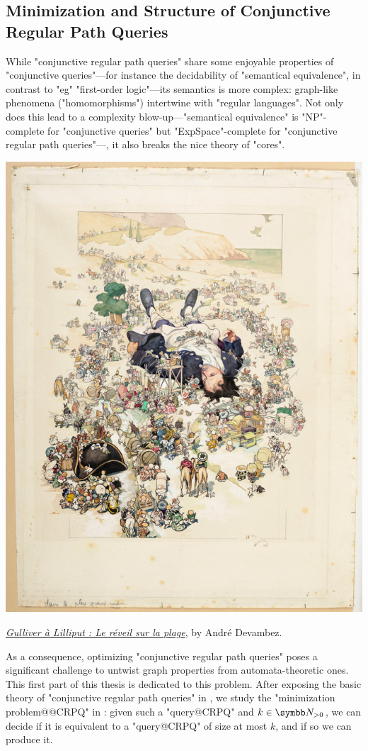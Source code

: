 \subsection[Minimization and Structure of CRPQs]{Minimization and Structure of Conjunctive Regular Path Queries}

While "conjunctive regular path queries" share some enjoyable properties
of "conjunctive queries"---for instance the decidability of "semantical equivalence",
in contrast to "eg" "first-order logic"---its semantics is more complex:
graph-like phenomena ("homomorphisms") intertwine with "regular languages".
Not only does this lead to a complexity blow-up---"semantical equivalence" is "NP"-complete
for "conjunctive queries" but "ExpSpace"-complete for "conjunctive regular path queries"---,
it also breaks the nice theory of "cores".

\begin{marginfigure}[5em]
	\centering
	\includegraphics[width=\linewidth]{fig/intro/Gulliver.jpg}
	\caption{\href{https://www.musee-orsay.fr/fr/oeuvres/gulliver-lilliput-le-reveil-sur-la-plage-248152}{\emph{Gulliver à Lilliput : Le réveil sur la plage}}, by André Devambez.}
\end{marginfigure}
As a consequence, optimizing "conjunctive regular path queries" poses
a significant challenge to untwist graph properties from automata-theoretic ones.
This first part of this thesis is dedicated to this problem.
After exposing the basic theory of "conjunctive regular path queries"
in , we study
the "minimization problem@@CRPQ" in :
given such a "query@CRPQ" and $k\in\Np$, we can decide if it is equivalent to a "query@CRPQ"
of size at most $k$, and if so we can produce it.

